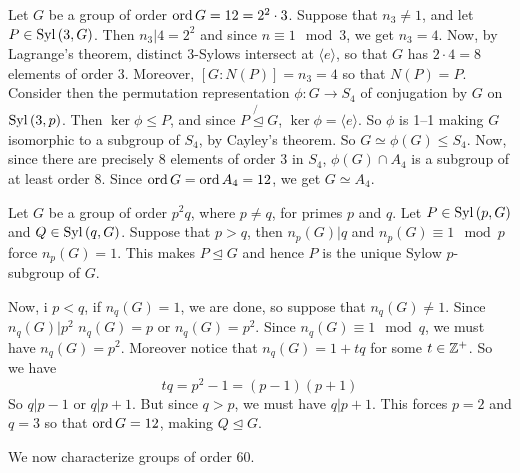 \begin{example}\label{example_4.16}
  Let $G$ be a group of order $\operatorname{ord}{G}=12=2^2 \cdot 3$. Suppose that $n_3 \neq
  1$, and let $P \in \operatorname{Syl}{(3,G)}$. Then $n_3|4=2^2$ and since $n \equiv 1
  \mod{3}$, we get $n_3=4$. Now, by Lagrange's theorem, distinct $3$-Sylows
  intersect at  $\langle e \rangle$, so that $G$ has $2 \cdot 4=8$ elements of
  order $3$. Moreover,  $[G:N(P)]=n_3=4$ so that $N(P)=P$. Consider then the
  permutation representation $\phi:G \xrightarrow{} S_4$ of conjugation by $G$
  on  $\operatorname{Syl}{(3,p)}$. Then $\ker{\phi} \leq P$, and since $P \not{\unlhd} G$,
  $\ker{\phi}=\langle e \rangle$. So $\phi$ is 1--1 making $G$ isomorphic to a
  subgroup of $S_4$, by Cayley's theorem. So $G \simeq \phi(G) \leq S_4$. Now,
  since there are precisely $8$ elements of order  $3$ in $S_4$, $\phi(G) \cap
  A_4$ is a subgroup of at least order $8$. Since  $\operatorname{ord}{G}=\operatorname{ord}{A_4}=12$, we
  get $G \simeq A_4$.
\end{example}

\begin{example}\label{example_4.17}
  Let $G$ be a group of order  $p^2q$, where  $p \neq q$, for primes  $p$ and
  $q$. Let  $P \in \operatorname{Syl}{(p,G)}$ and $Q \in \operatorname{Syl}{(q,G)}$. Suppose that $p>q$,
  then  $n_p(G)|q$ and $n_p(G) \equiv 1 \mod{p}$ force $n_p(G)=1$. This makes
  $P \unlhd G$ and hence $P$ is the unique Sylow $p$-subgroup of $G$.

  Now, i  $p<q$, if $n_q(G)=1$, we are done, so suppose that $n_q(G) \neq 1$.
  Since $n_q(G)|p^2$ $n_q(G)=p$ or $n_q(G)=p^2$. Since  $n_q(G) \equiv 1
  \mod{q}$, we must have $n_q(G)=p^2$. Moreover notice that  $n_q(G)=1+tq$
  for some $t \in \mathbb{Z}^+$. So we have
  \begin{equation*}
    tq=p^2-1=(p-1)(p+1)
  \end{equation*}
  So $q|p-1$ or  $q|p+1$. But since  $q>p$, we must have  $q|p+1$. This
  forces  $p=2$ and  $q=3$ so that  $\operatorname{ord}{G}=12$, making $Q \unlhd G$.
\end{example}

We now characterize groups of order $60$.

